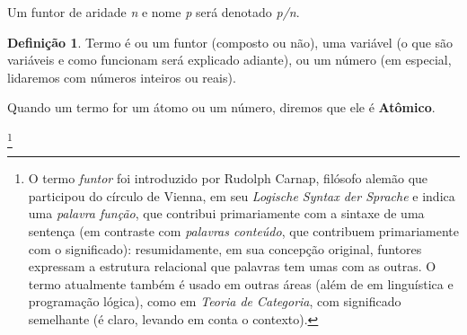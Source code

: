 \documentclass{article}
\theoremstyle{definition}
\newtheorem{definition}{Definição}[section]
\theoremstyle{remark}
\begin{document}
    Um funtor de aridade \textit{n} e nome \textit{p} será denotado \textit{p/n}.



  \theoremstyle{definition}
  \begin{definition}{Termo}
     é ou um funtor (composto ou não), uma variável (o que são variáveis e como funcionam será explicado adiante), ou um número (em especial, lidaremos com números inteiros ou reais).
  \end{definition}

  Quando um termo for um átomo ou um número, diremos que ele é \textbf{Atômico}.

  \footnote{ O termo \textit{funtor} foi introduzido por Rudolph Carnap, filósofo alemão que participou do círculo de Vienna, em seu \textit{Logische Syntax der Sprache} e indica uma \textit{palavra função}, que contribui primariamente com a sintaxe de uma sentença (em contraste com \textit{palavras conteúdo}, que contribuem primariamente com o significado): resumidamente, em sua concepção original, funtores expressam a estrutura relacional que palavras tem umas com as outras. O termo atualmente
    também é usado em outras áreas (além de em linguística e programação lógica), como em \textit{Teoria de Categoria}, com   significado semelhante (é claro, levando em conta o contexto).  }
\end{document}
